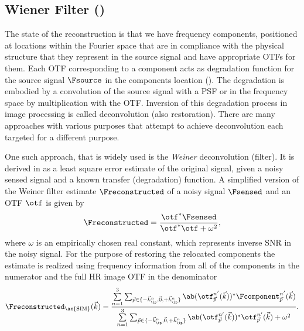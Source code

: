 \begin{marginfigure}[*-16]
  \caption{\ac{OTF}s \(\otf_{\vec{p}}'\) of the \(\vec{p}\)-shifted components.}
\end{marginfigure}

\subsection{Wiener Filter ()}

The state of the reconstruction is that we have frequency components, positioned at locations within the Fourier space 
    that are in compliance with the physical structure that they represent in the source signal and have appropriate 
    \acs{OTF}s for them.
Each \ac{OTF} corresponding to a component acts as degradation function for the source signal \(\Fsource\) in the
    components location ().
The degradation is embodied by a convolution of the source signal with a \ac{PSF} or in the frequency space
    by multiplication with the \ac{OTF}.
Inversion of this degradation process in image processing is called deconvolution (also restoration).
There are many approaches with various purposes that attempt to achieve deconvolution each targeted for a different
    purpose.

One such approach, that is widely used is the \emph{Weiner} deconvolution (filter). 
It is derived in as a least square error estimate of the original signal, given a noisy sensed signal and a known
    transfer (degradation) function.%
A simplified version of the Weiner filter estimate \(\Freconstructed\) of a noisy signal \(\Fsensed\) and an \ac{OTF} 
    \(\otf\) is given by
    \begin{equation*}
        \Freconstructed = \frac{\otf^*\Fsensed}{\otf^*\otf + \omega^2},
    \end{equation*}
    where \(\omega\) is an empirically chosen real constant, which represents inverse \ac{SNR} in the noisy signal.
For the purpose of restoring the relocated components the estimate is realized using frequency information from all of 
    the components in the numerator and the full \ac{HR} image \ac{OTF} in the denominator
    \begin{equation*}
        \Freconstructed_{\text{\ac{SIM}}}(\vec{k}) = \frac{\sum\limits_{n = 1}^{3}\sum_{\vec{p} \in \{-\vec{k}^{n}_\ip,
        \vec{0}, +\vec{k}^{n}_\ip\}} \ab(\otf^{n'}_{\vec{p}}(\vec{k}))^*
        \Fcomponent^{n'}_{\vec{p}}(\vec{k})}{\sum\limits_{n = 1}^{3}\sum_{\vec{p} \in \{-\vec{k}^{n}_\ip,
        \vec{0}, +\vec{k}^{n}_\ip\}} \ab(\otf^{n'}_{\vec{p}}(\vec{k}))^*
\otf^{n'}_{\vec{p}}(\vec{k}) + \omega^2}.
    \end{equation*}

